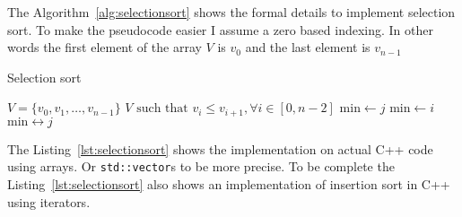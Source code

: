 The Algorithm~\ref{alg:selectionsort} shows the formal details to implement selection sort.
To make the pseudocode easier I assume a zero based indexing.
In other words the first element of the array $V$ is $v_0$ and the last element is $v_{n-1}$

\begin{algorithm}[H]
\caption{Selection sort}
\label{alg:selectionsort}
\begin{algorithmic}[1] %
\Require $V = \{ v_0, v_1, \ldots, v_{n-1} \} $ 
\Ensure $V\text{ such that } v_i \leq v_{i + 1}, \forall i \in [0, n-2]$ 
    \State $\text{min} \gets j$ 
     
            \State $\text{min} \gets i$
        \EndIf
    \EndFor
     
        \State $\text{min} \leftrightarrow j$ 
    \EndIf
\EndFor
\EndProcedure
\end{algorithmic}
\end{algorithm}

The Listing~\ref{lst:selectionsort} shows the implementation on actual C++ code using arrays. Or \texttt{std::vector}s to be more precise.
To be complete the Listing~\ref{lst:selectionsort} also shows an implementation of   insertion sort in C++ using iterators.


 

